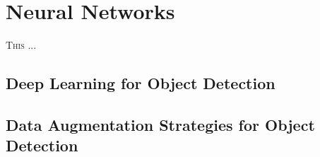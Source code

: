 \chapter{Neural Networks}
\label{chap:neuralnetworks}
%
\lettrine[lines=3]{T}{his} ...
% 
% 
\newpage



\section{Deep Learning for Object Detection}
\label{sec:nn-objectdetection}

\section{Data Augmentation Strategies for Object Detection}
\label{sec:nn-augmentation-strategies}
